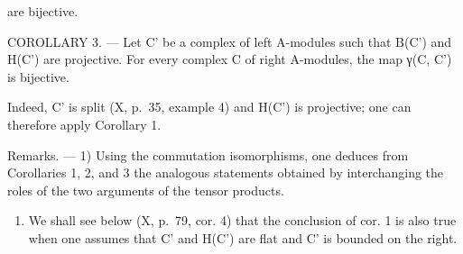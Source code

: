 are bijective.

COROLLARY 3. --- Let C' be a complex of left A-modules such that B(C') and H(C') are projective. For every complex C of right A-modules, the map γ(C, C') is bijective.

Indeed, C' is split (X, p.~35, example 4) and H(C') is projective; one can therefore apply Corollary 1.

Remarks. --- 1) Using the commutation isomorphisms, one deduces from Corollaries 1, 2, and 3 the analogous statements obtained by interchanging the roles of the two arguments of the tensor products.

\begin{enumerate}
\def\labelenumi{\arabic{enumi})}
\setcounter{enumi}{1}
\tightlist
\item
  We shall see below (X, p.~79, cor. 4) that the conclusion of cor. 1 is also true when one assumes that C' and H(C') are flat and C' is bounded on the right.
\end{enumerate}

